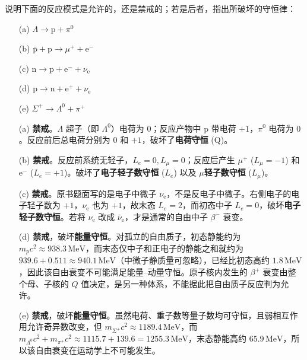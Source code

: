 \begin{exercise}\label{ex:30.7}
说明下面的反应模式是允许的，还是禁戒的；若是后者，指出所破坏的守恒律：
\begin{enumerate}
  \item[(a)] $\Lambda \rightarrow \mathrm{p} + \pi^0$
  \item[(b)] $\bar{\mathrm{p}} + \mathrm{p} \rightarrow \mu^+ + \mathrm{e}^-$
  \item[(c)] $\mathrm{n} \rightarrow \mathrm{p} + \mathrm{e}^- + \nu_{\mathrm{e}}$
  \item[(d)] $\mathrm{p} \rightarrow \mathrm{n} + \mathrm{e}^+ + \nu_{\mathrm{e}}$
  \item[(e)] $\Sigma^+ \rightarrow \Lambda^0 + \pi^+$
\end{enumerate}
\end{exercise}
\begin{solution}
\begin{enumerate}
    \item[(a)] \textbf{禁戒}。$\Lambda$ 超子（即 $\Lambda^0$）电荷为 $0$；反应产物中 $\mathrm{p}$ 带电荷 $+1$，$\pi^0$ 电荷为 $0$。反应前后总电荷分别为 $0$ 和 $+1$，破坏了\textbf{电荷守恒} (Q)。
    \item[(b)] \textbf{禁戒}。反应前系统无轻子，$L_e = 0, L_\mu = 0$；反应后产生 $\mu^+$ ($L_\mu = -1$) 和 $\mathrm{e}^-$ ($L_e = +1$)。破坏了\textbf{电子轻子数守恒} ($L_e$) 以及 \textbf{$\mu$轻子数守恒} ($L_\mu$)。
    \item[(c)] \textbf{禁戒}。原书题面写的是电子中微子 $\nu_{\mathrm{e}}$，不是反电子中微子。右侧电子的电子轻子数为 $+1$，$\nu_{\mathrm{e}}$ 也为 $+1$，故末态 $L_e=2$，而初态中子 $L_e=0$，破坏\textbf{电子轻子数守恒}。若将 $\nu_{\mathrm{e}}$ 改成 $\bar{\nu}_{\mathrm{e}}$，才是通常的自由中子 $\beta^-$ 衰变。
    \item[(d)] \textbf{禁戒}，破坏\textbf{能量守恒}。对孤立的自由质子，初态静能约为 $m_pc^2\approx938.3\,\mathrm{MeV}$，而末态仅中子和正电子的静能之和就约为 $939.6+0.511\approx940.1\,\mathrm{MeV}$（中微子静质量可忽略），已经比初态高约 $1.8\,\mathrm{MeV}$，因此该自由衰变不可能满足能量--动量守恒。原子核内发生的 $\beta^+$ 衰变由整个母、子核的 $Q$ 值决定，是另一种体系，不能据此把自由质子反应判为允许。
    \item[(e)] \textbf{禁戒}，破坏\textbf{能量守恒}。虽然电荷、重子数等量子数均可守恒，且弱相互作用允许奇异数改变，但 $m_{\Sigma^+}c^2\approx1189.4\,\mathrm{MeV}$，而 $m_{\Lambda^0}c^2+m_{\pi^+}c^2\approx1115.7+139.6=1255.3\,\mathrm{MeV}$，末态静能高约 $65.9\,\mathrm{MeV}$，所以该自由衰变在运动学上不可能发生。
\end{enumerate}
\end{solution}

